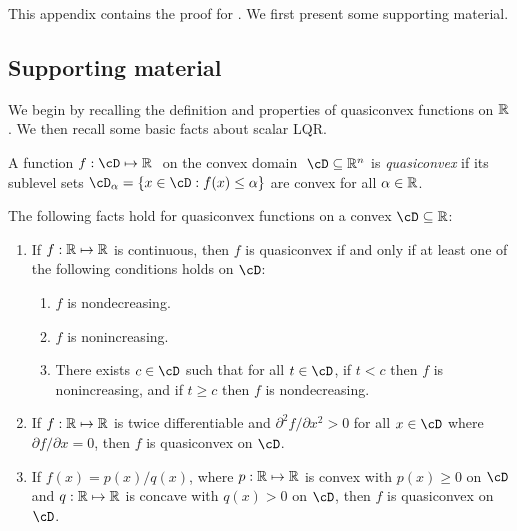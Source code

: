 \label{sec:appendix-theory}

This appendix contains the proof for .
We first present some supporting material.

\subsection{Supporting material}
We begin by recalling the definition and properties of quasiconvex functions on $\mathbb{R}$.
We then recall some basic facts about scalar LQR.

\begin{definition}
	A function $f : \cD \mapsto \R\ $ on the convex domain $\ \cD \subseteq \R^n$
	is \emph{quasiconvex} if its sublevel sets
	\(
		\cD_\alpha = \{ x \in \cD : f(x) \leq \alpha \}
	\)
	are convex for all $\alpha \in \mathbb{R}$.
\end{definition}

\begin{lemma}
\label{lem:quasiconvex}
	The following facts hold for quasiconvex functions on a convex $\cD \subseteq \R$:
	\begin{enumerate}[label=(\alph*)]
		\item \label{alternatives}
			If $f: \mathbb{R} \mapsto \mathbb{R}$ is continuous,
			then $f$ is quasiconvex
			if and only if at least one of the following conditions holds on $\cD$:
			\begin{enumerate}[label=\arabic*.]
				\item $f$ is nondecreasing.
				\item $f$ is nonincreasing.
				\item \label{alternative-incdec}
					There exists $c \in \cD$ such that
					for all $t \in \cD$,
					if $t < c$ then $f$ is nonincreasing,
					and if $t \geq c$ then $f$ is nondecreasing.
			\end{enumerate}
		\item \label{secondorder}
			If $f : \mathbb{R} \mapsto \mathbb{R}$ is twice differentiable
			and
			$\partial^2 f / \partial x^2 > 0$
			for all $x \in \cD$ where
			$\partial f / \partial x = 0$,
			then $f$ is quasiconvex on $\cD$.
		\item \label{quotient}
			If $f(x) = p(x) / q(x)$,
			where $p: \mathbb{R} \mapsto \mathbb{R}$ is convex with $p(x) \geq 0$ on $\cD$
			and $q: \mathbb{R} \mapsto \mathbb{R}$ is concave with $q(x) > 0$ on $\cD$,
			then $f$ is quasiconvex on $\cD$.
	\end{enumerate}
\end{lemma}

